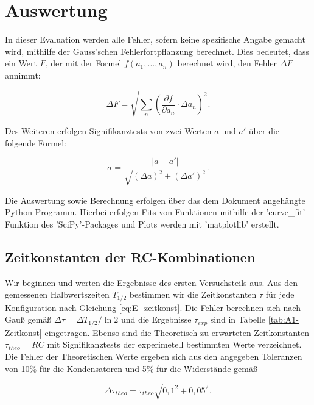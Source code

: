 \documentclass{article}
\begin{document}
\clearpage
\newpage
\section{Auswertung}

In dieser Evaluation werden alle Fehler, sofern keine spezifische Angabe gemacht wird, mithilfe der Gauss'schen Fehlerfortpflanzung berechnet. Dies bedeutet, dass ein Wert $F$, der mit der Formel $f(a_1, ..., a_n)$ berechnet wird, den Fehler $\Delta F$ annimmt:

\begin{equation}
    \Delta F = \sqrt{\sum_n \left( \frac{\partial f}{\partial a_n} \cdot \Delta a_n \right)^2}.
\end{equation}

Des Weiteren erfolgen Signifikanztests von zwei Werten $a$ und $a'$ über die folgende Formel:

\begin{equation}
    \sigma = \frac{|a-a'|}{\sqrt{(\Delta a)^2 + (\Delta a')^2}}.
\end{equation}

Die Auswertung sowie Berechnung erfolgen über das dem Dokument angehängte Python-Programm. Hierbei erfolgen Fits von Funktionen mithilfe der 'curve\_fit'-Funktion des 'SciPy'-Packages und Plots werden mit 'matplotlib' erstellt.

\newpage

\subsection{Zeitkonstanten der RC-Kombinationen}

Wir beginnen und werten die Ergebnisse des ersten Versuchsteils aus. Aus den gemessenen Halbwertszeiten $T_{1/2}$ bestimmen wir die Zeitkonstanten $\tau$ für jede Konfiguration nach Gleichung \ref{eq:E_zeitkonst}. Die Fehler berechnen sich nach Gauß gemäß $\Delta \tau = \Delta T_{1/2} / \ln{2}$ und die Ergebnisse $\tau_{exp}$ sind in Tabelle \ref{tab:A1-Zeitkonst} eingetragen. Ebenso sind die Theoretisch zu erwarteten Zeitkonstanten $\tau_{theo} = R C$ mit Signifikanztests der experimetell bestimmten Werte verzeichnet. Die Fehler der Theoretischen Werte ergeben sich aus den angegeben Toleranzen von 10\% für die Kondensatoren und 5\% für die Widerstände gemäß

\begin{equation}
    \Delta \tau_{theo} = \tau_{theo} \sqrt{0,1^2 + 0,05^2}.
\end{equation}
\end{document}
